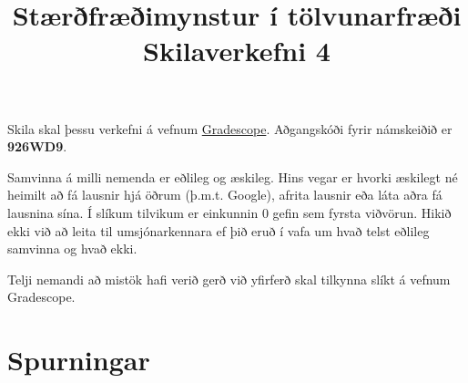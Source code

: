 \documentclass{exam}
\title{Stærðfræðimynstur í tölvunarfræði \\ Skilaverkefni 4}
\author{}
\begin{document}
\maketitle
\thispagestyle{empty} 

Skila skal þessu verkefni á vefnum \href{https://gradescope.com/}{Gradescope}. Aðgangskóði fyrir námskeiðið er \textbf{926WD9}.

Samvinna á milli nemenda er eðlileg og æskileg. Hins vegar er hvorki æskilegt né heimilt að fá lausnir hjá öðrum (þ.m.t. Google), afrita lausnir eða láta aðra fá lausnina sína. Í slíkum tilvikum er einkunnin 0 gefin sem fyrsta viðvörun. Hikið ekki við að leita til umsjónarkennara ef þið eruð í vafa um hvað telst eðlileg samvinna og hvað ekki.

Telji nemandi að mistök hafi verið gerð við yfirferð skal tilkynna slíkt á vefnum Gradescope.

\section{Spurningar}
\end{document}
